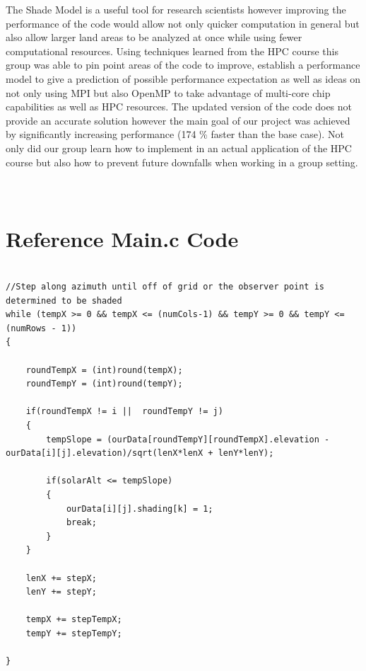 \documentclass[]{article}%
\begin{document}
The Shade Model is a useful tool for research scientists however improving the performance of the code would allow not only quicker computation in general but also allow larger land areas to be analyzed at once while using fewer computational resources. Using techniques learned from the HPC course this group was able to pin point areas of the code to improve, establish a performance model to give a prediction of possible performance expectation as well as ideas on not only using MPI but also OpenMP to take advantage of multi-core chip capabilities as well as HPC resources. The updated version of the code does not provide an accurate solution however the main goal of our project was achieved  by significantly increasing performance (174 \% faster than the base case). Not only did our group learn how to implement in an actual application of the HPC course but also how to prevent future downfalls when working in a group setting.





\newpage
\appendix
\section{\\Reference Main.c Code} \label{App:loop_code_main.c}

{\small
\begin{verbatim}

//Step along azimuth until off of grid or the observer point is determined to be shaded
while (tempX >= 0 && tempX <= (numCols-1) && tempY >= 0 && tempY <= (numRows - 1))
{	

	roundTempX = (int)round(tempX);
	roundTempY = (int)round(tempY);			

	if(roundTempX != i ||  roundTempY != j) 
	{
		tempSlope = (ourData[roundTempY][roundTempX].elevation - ourData[i][j].elevation)/sqrt(lenX*lenX + lenY*lenY);	

		if(solarAlt <= tempSlope)
		{	
			ourData[i][j].shading[k] = 1;
			break;
		}
	}												

	lenX += stepX;		
	lenY += stepY;

	tempX += stepTempX;
	tempY += stepTempY;

}
\end{verbatim}}
\end{document}
